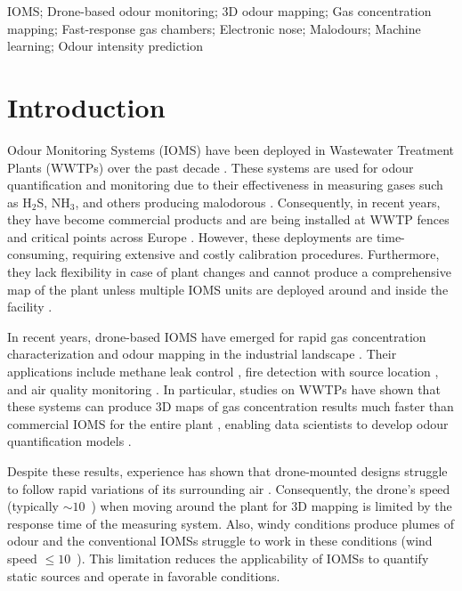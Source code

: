 \documentclass[lettersize,journal]{IEEEtran}
\begin{document}
\begin{IEEEkeywords}
IOMS; Drone-based odour monitoring; 3D odour mapping; Gas concentration mapping; Fast-response gas chambers; Electronic nose; Malodours; Machine learning; Odour intensity prediction
\end{IEEEkeywords}

\section{Introduction}
\label{sec:intro}
 Odour Monitoring Systems (IOMS) have been deployed in Wastewater Treatment Plants (WWTPs) over the past decade \cite{persaud2005medical, capelli2014electronic, di2017real, blanco2018development}. These systems are used for odour quantification and monitoring due to their effectiveness in measuring gases such as H$_2$S, NH$_3$, and others producing malodorous \cite{cangialosi2018, daelman2012methane}. Consequently, in recent years, they have become commercial products and are being installed at WWTP fences and critical points across Europe \cite{blanco2018development, prudenza2023implementation, cipriano2019evolution, deshmukh2015application}. However, these deployments are time-consuming, requiring extensive and costly calibration procedures. Furthermore, they lack flexibility in case of plant changes and cannot produce a comprehensive map of the plant unless multiple IOMS units are deployed around and inside the facility \cite{ratti2024real}.

In recent years, drone-based IOMS have emerged for rapid gas concentration characterization and odour mapping in the industrial landscape \cite{pobkrut2016sensor, burgues2021rhinos, burgues2022characterization}. Their applications include methane leak control \cite{tassielli2024detection}, fire detection with source location \cite{yandouzi2023investigation}, and air quality monitoring \cite{burgués2023drone}. In particular, studies on WWTPs have shown that these systems can produce 3D maps of gas concentration results much faster than commercial IOMS for the entire plant \cite{burgués2019high}, enabling data scientists to develop odour quantification models \cite{cangialosi2022integrating, benegiamo2024optimization}.

Despite these results, experience has shown that drone-mounted designs struggle to follow rapid variations of its surrounding air \cite{burgues2021rhinos, burgues2022characterization, benegiamo2024optimization}. Consequently, the drone's speed (typically $\sim$$10$~) when moving around the plant for 3D mapping is limited by the response time of the measuring system. Also, windy conditions produce plumes of odour and the conventional IOMSs struggle to work in these conditions (wind speed $\leq 10$~). This limitation reduces the applicability of IOMSs to quantify static sources and operate in favorable conditions.
\end{document}
